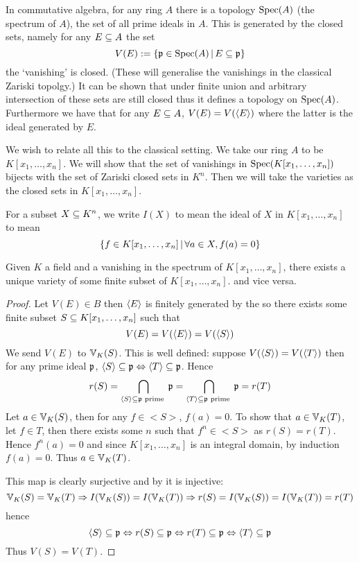 \begin{dfn}
    In commutative algebra, 
    for any ring $A$ there is a topology $\operatorname{Spec}(A)$
    (the spectrum of $A$),
    the set of all prime ideals in $A$.
    This is generated by the closed sets, 
    namely for any $E \subseteq A$ the set 
    \[V(E) := \left\{\mathfrak{p} \in \operatorname{Spec}(A) \,|\, E \subseteq \mathfrak{p}\right\}\]
    the `vanishing' is closed. 
    (These will generalise the vanishings
    in the classical Zariski topolgy.)
    It can be shown that under finite union and arbitrary intersection of these
    sets are still closed thus it defines a topology on $\operatorname{Spec}(A)$.
    Furthermore we have that for any $E \subseteq A$, 
    $V(E) = V(\langle E\rangle)$ where the latter is the ideal generated by $E$.
\end{dfn}
We wish to relate all this to the classical setting.
We take our ring $A$ to be $K[x_1,\dots,x_n]$.
We will show that the set of vanishings in $\operatorname{Spec}(K[x_1,\dots,x_n])$
bijects with
the set of Zariski closed sets in $K^n$.
Then we will take the varieties as the closed sets in $K[x_1,\dots,x_n]$.

\begin{nttn}
    For a subset $X \subseteq K^n$, 
    we write $I(X)$ to mean the ideal of $X$ in $K[x_1,\dots,x_n]$ to mean
    \[\left\{f \in K[x_1,\dots, x_n] \,|\, \forall a \in X, f(a) = 0\right\}\]
\end{nttn}

\begin{prop}
    Given $K$ a field and a vanishing in the spectrum of 
    $K[x_1,\dots, x_n]$, there exists a unique variety of some finite 
    subset of $K[x_1,\dots,x_n]$.
    and vice versa.
\end{prop}
\begin{proof}
    Let $V(E) \in B$ then 
    $\langle E\rangle$ is finitely generated by the 
    so there exists some finite subset $S \subseteq K[x_1, \dots, x_n]$ such that
    \[V(E) = V(\langle E\rangle) = V(\langle S\rangle)\]
    We send $V(E)$ to $\mathbb{V}_K(S)$.
    This is well defined: suppose $V(\langle S\rangle) = V(\langle T\rangle)$ then
    for any prime ideal $\mathfrak{p}$, 
    $\langle S\rangle \subseteq \mathfrak{p} \Leftrightarrow \langle T\rangle \subseteq \mathfrak{p}$.
    Hence 
    \[
        r(S) = \bigcap_{\langle S\rangle \subseteq \mathfrak{p} \text{ prime }} \mathfrak{p}
        = \bigcap_{\langle T\rangle \subseteq \mathfrak{p} \text{ prime }} \mathfrak{p}
        = r(T)
    \]
    Let $a \in \mathbb{V}_K(S)$, then for any $f \in <S>$, $f(a) = 0$.
    To show that $a \in \mathbb{V}_K(T)$,
    let $f \in T$,
    then there exists some $n$ such that $f^n \in <S>$ as $r(S) = r(T)$.
    Hence $f^n(a) = 0$ and since $K[x_1,\dots,x_n]$ is an integral domain,
    by induction $f(a) = 0$.
    Thus $a \in \mathbb{V}_K(T)$.

    This map is clearly surjective and by
    it is injective:
    \[\mathbb{V}_K(S) = \mathbb{V}_K(T) \Rightarrow I(\mathbb{V}_K(S)) = I(\mathbb{V}_K(T)) \Rightarrow 
    r(S) = I(\mathbb{V}_K(S)) = I(\mathbb{V}_K(T)) = r(T)\]
    hence 
    \[  
        \langle S\rangle \subseteq \mathfrak{p} \Leftrightarrow r(S) \subseteq \mathfrak{p} 
        \Leftrightarrow r(T) \subseteq \mathfrak{p} \Leftrightarrow \langle T\rangle \subseteq \mathfrak{p}
    \]
    Thus $V(S) = V(T)$.
\end{proof}

